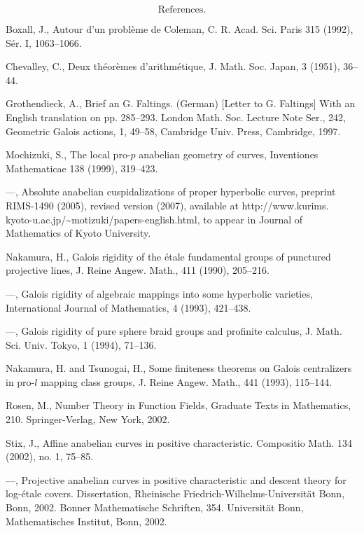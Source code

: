 $$\text{References.}$$

\noindent
[Boxall] Boxall, J., 
Autour d'un probl\`eme de Coleman, 
C. R. Acad. Sci. Paris 315 (1992), S\'er. I, 1063--1066. 


\noindent
[Chevalley] Chevalley, C., 
Deux th\'eor\`emes d'arithm\'etique, J. Math. Soc. Japan, 3 (1951), 
36--44. 

\noindent
[Grothendieck] Grothendieck, A., Brief an G. Faltings. (German) [Letter to G. Faltings] 
With an English translation on pp. 285--293. London Math. Soc. Lecture Note Ser., 242,  
Geometric Galois actions, 1,  49--58, Cambridge Univ. Press, Cambridge, 1997.

\noindent
[Mochizuki1] Mochizuki, S., 
The local pro-$p$ anabelian geometry of curves, 
Inventiones Mathematicae 138 (1999), %
319--423. 

\noindent
[Mochizuki2] ---, Absolute anabelian cuspidalizations of proper 
hyperbolic curves, preprint RIMS-1490 (2005), revised version (2007), 
available at 
http://www.kurims.
\linebreak
kyoto-u.ac.jp/\~{}motizuki/papers-english.html, 
to appear in Journal of Mathematics of Kyoto University. 

\noindent
[Nakamura1] Nakamura, H., 
Galois rigidity of the \'etale fundamental groups of punctured projective lines, 
J. Reine Angew. Math., 411 (1990), 205--216. 

\noindent
[Nakamura2] ---, Galois rigidity of algebraic mappings 
into some hyperbolic varieties, 
International Journal of Mathematics, 4 (1993), 421--438. 

\noindent
[Nakamura3] ---, 
Galois rigidity of pure sphere braid groups and profinite calculus, 
J. Math. Sci. Univ. Tokyo, 1 (1994), 
71--136. 

\noindent
[NT] Nakamura, H. and Tsunogai, H., Some finiteness theorems 
on Galois centralizers in pro-$l$ mapping class groups, 
J. Reine Angew. Math., 441 (1993), 115--144. 


\noindent
[Rosen] Rosen, M., Number Theory in Function Fields, 
Graduate Texts in Mathematics, 210. Springer-Verlag, New York, 2002.

\noindent
[Stix1] Stix, J., Affine anabelian curves in positive characteristic.  
Compositio Math.  134  (2002),  no. 1, 75--85.

\noindent
[Stix2] ---, Projective anabelian curves in positive characteristic 
and descent theory for log-\'etale covers. Dissertation, Rheinische 
Friedrich-Wilhelms-Universit\"at Bonn, Bonn, 2002. Bonner Mathematische Schriften, 
354. Universit\"at Bonn, 
Mathematisches Institut, Bonn, 2002.


